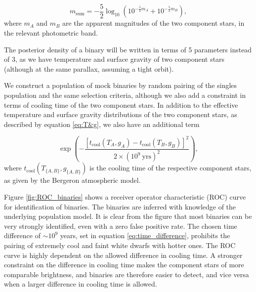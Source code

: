 \documentclass[fleqn,usenatbib]{mnras}
\newcommand{\Teff}{T}
\newcommand{\logg}{g}
\begin{document}
\begin{equation}
	m_\text{sum} = - \frac{5}{2}\log_{10}\left( 10^{-\frac{5}{2}m_{A}}+10^{-\frac{5}{2}m_{B}}  \right),
\end{equation}
where $m_A$ and $m_B$ are the apparent magnitudes of the two component stars, in the relevant photometric band.

The posterior density of a binary will be written in terms of 5 parameters instead of 3, as we have temperature and surface gravity of two component stars (although at the same parallax, assuming a tight orbit).

We construct a population of mock binaries by random pairing of the singles population and the same selection criteria, although we also add a constraint in terms of cooling time of the two component stars. In addition to the effective temperature and surface gravity distributions of the two component stars, as described by equation \eqref{eq:T&g}, we also have an additional term

\begin{equation}\label{eq:time_difference}
	\exp\left(
	-\frac{[t_\text{cool}(\Teff_A,\logg_A)-t_\text{cool}(\Teff_B,\logg_B)]^2}{2\times (10^9~\text{yrs})^2}
	\right),
\end{equation}
where $t_\text{cool}(\Teff_{\{A,B\}},\logg_{\{A,B\}})$ is the cooling time of the respective component stars, as given by the Bergeron atmospheric model.

Figure \ref{fig:ROC_binaries} shows a receiver operator characteristic (ROC) curve for identification of binaries. The binaries are inferred with knowledge of the underlying population model. It is clear from the figure that most binaries can be very strongly identified, even with a zero false positive rate. The chosen time difference of $\sim 10^9$ years, set in equation \eqref{eq:time_difference}, prohibits the pairing of extremely cool and faint white dwarfs with hotter ones. The ROC curve is highly dependent on the allowed difference in cooling time. A stronger constraint on the difference in cooling time makes the component stars of more comparable brightness, and binaries are therefore easier to detect, and vice versa when a larger difference in cooling time is allowed.
\end{document}
